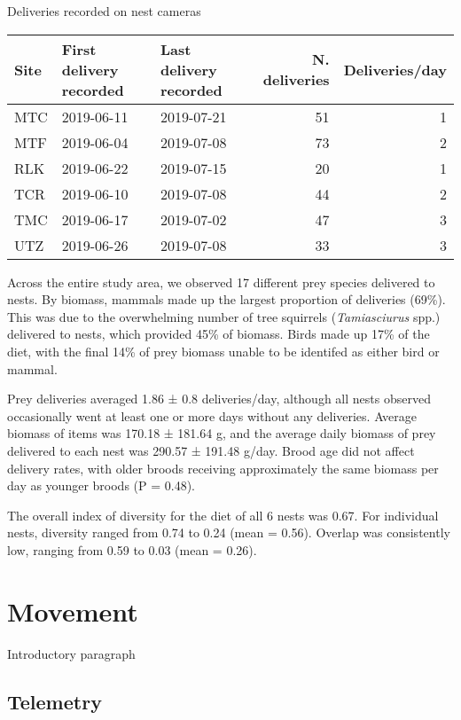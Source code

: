 \documentclass[]{article}
\begin{document}
\begin{capctable}

\caption{\label{tab:unnamed-chunk-3}Deliveries recorded on nest cameras}
\centering
\begin{tabular}[t]{lllrr}
\toprule
Site & First delivery recorded & Last delivery recorded & N. deliveries & Deliveries/day\\
\midrule
MTC & 2019-06-11 & 2019-07-21 & 51 & 1\\
MTF & 2019-06-04 & 2019-07-08 & 73 & 2\\
RLK & 2019-06-22 & 2019-07-15 & 20 & 1\\
TCR & 2019-06-10 & 2019-07-08 & 44 & 2\\
TMC & 2019-06-17 & 2019-07-02 & 47 & 3\\
\addlinespace
UTZ & 2019-06-26 & 2019-07-08 & 33 & 3\\
\bottomrule
\end{tabular}
\end{capctable}

Across the entire study area, we observed 17 different prey species
delivered to nests. By biomass, mammals made up the largest proportion
of deliveries (69\%). This was due to the overwhelming number of tree
squirrels (\emph{Tamiasciurus} spp.) delivered to nests, which provided
45\% of biomass. Birds made up 17\% of the diet, with the final 14\% of
prey biomass unable to be identifed as either bird or mammal.

Prey deliveries averaged 1.86 ± 0.8 deliveries/day, although all nests
observed occasionally went at least one or more days without any
deliveries. Average biomass of items was 170.18 ± 181.64 g, and the
average daily biomass of prey delivered to each nest was 290.57 ± 191.48
g/day. Brood age did not affect delivery rates, with older broods
receiving approximately the same biomass per day as younger broods (P =
0.48).

The overall index of diversity for the diet of all 6 nests was 0.67. For
individual nests, diversity ranged from 0.74 to 0.24 (mean = 0.56).
Overlap was consistently low, ranging from 0.59 to 0.03 (mean = 0.26).

\section{Movement}\label{movement}

Introductory paragraph

\subsection{Telemetry}\label{telemetry}
\end{document}
